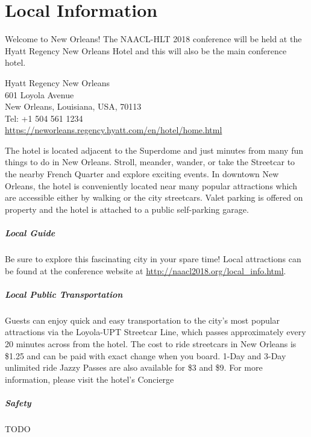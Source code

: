 \chapter{Local Information}

Welcome to New Orleans!  The NAACL-HLT 2018 conference will be held at the Hyatt Regency New Orleans Hotel and this will also be the main conference hotel.

Hyatt Regency New Orleans \\
601 Loyola Avenue \\
New Orleans, Louisiana, USA, 70113 \\
Tel: +1 504 561 1234\\
\url{https://neworleans.regency.hyatt.com/en/hotel/home.html}

The hotel is located adjacent to the Superdome and just minutes from many fun things to do in New Orleans. Stroll, meander, wander, or take the Streetcar to the nearby French Quarter and explore exciting events.  In downtown New Orleans, the hotel is conveniently located near many popular attractions which are accessible either by walking or the city streetcars. Valet parking is offered on property and the hotel is attached to a public self-parking garage. 

\paragraph{Local Guide}

Be sure to explore this fascinating city in your spare time!  Local attractions can be found at the conference website at \url{http://naacl2018.org/local_info.html}.


\paragraph{Local Public Transportation}

Guests can enjoy quick and easy transportation to the city’s most popular attractions via the Loyola-UPT Streetcar Line, which passes approximately every 20 minutes across from the hotel. The cost to ride streetcars in New Orleans is \$1.25 and can be paid with exact change when you board. 1-Day and 3-Day unlimited ride Jazzy Passes are also available for \$3 and \$9. For more information, please visit the hotel’s Concierge

\paragraph{Safety}

TODO
